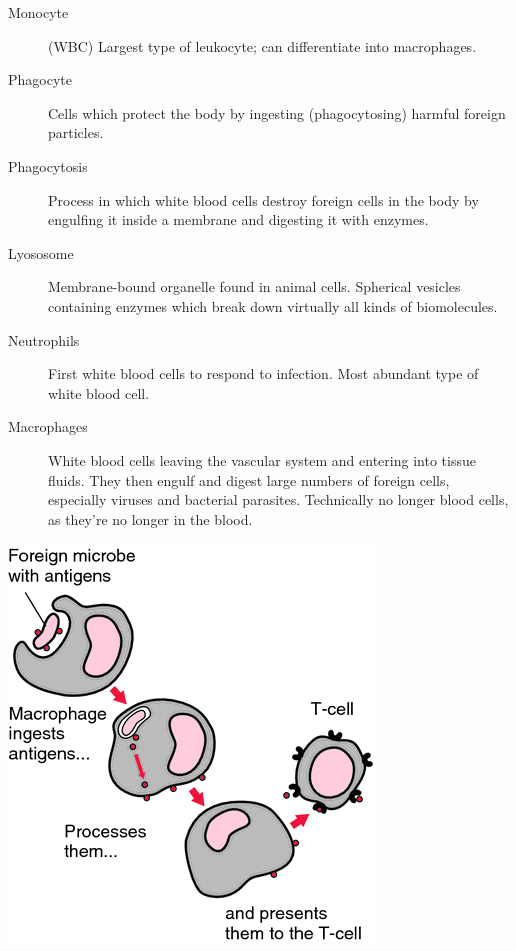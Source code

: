 \documentclass[11pt]{article}
\begin{document}
\begin{description}
\item[{Monocyte}] (WBC) Largest type of leukocyte; can differentiate into
macrophages.
\item[{Phagocyte}] Cells which protect the body by ingesting (phagocytosing) harmful
foreign particles.
\item[{Phagocytosis}] Process in which white blood cells destroy foreign cells in
the body by engulfing it inside a membrane and digesting it with enzymes.
\item[{Lyososome}] Membrane-bound organelle found in animal cells. Spherical
vesicles containing enzymes which break down virtually all kinds of
biomolecules.
\item[{Neutrophils}] First white blood cells to respond to infection. Most abundant
type of white blood cell.
\item[{Macrophages}] White blood cells leaving the vascular system and entering into
tissue fluids. They then engulf and digest large numbers of foreign cells,
especially viruses and bacterial parasites. Technically no longer blood
cells, as they're no longer in the blood.
\end{description}
\begin{center}
\includegraphics[width=.9\linewidth]{Ch. 9/X2604-M-02_2016-11-16_23-20-10.png}
\end{center}
\end{document}
